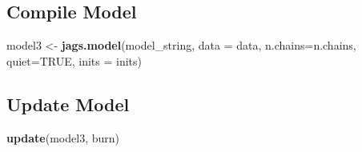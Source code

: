 \documentclass[
]{article}
\newenvironment{Shaded}{\begin{snugshade}}{\end{snugshade}}
\newcommand{\AttributeTok}[1]{\textcolor[rgb]{0.13,0.29,0.53}{#1}}
\newcommand{\ConstantTok}[1]{\textcolor[rgb]{0.56,0.35,0.01}{#1}}
\newcommand{\DecValTok}[1]{\textcolor[rgb]{0.00,0.00,0.81}{#1}}
\newcommand{\FloatTok}[1]{\textcolor[rgb]{0.00,0.00,0.81}{#1}}
\newcommand{\FunctionTok}[1]{\textcolor[rgb]{0.13,0.29,0.53}{\textbf{#1}}}
\newcommand{\NormalTok}[1]{#1}
\newcommand{\OtherTok}[1]{\textcolor[rgb]{0.56,0.35,0.01}{#1}}
\newcommand{\SpecialCharTok}[1]{\textcolor[rgb]{0.81,0.36,0.00}{\textbf{#1}}}
\begin{document}
\begin{Shaded}
\end{Shaded}

\subsection{Compile Model}\label{compile-model-2}

\begin{Shaded}
\begin{Highlighting}[]
\NormalTok{model3 }\OtherTok{\textless{}{-}} \FunctionTok{jags.model}\NormalTok{(model\_string, }\AttributeTok{data =}\NormalTok{ data, }\AttributeTok{n.chains=}\NormalTok{n.chains, }\AttributeTok{quiet=}\ConstantTok{TRUE}\NormalTok{, }\AttributeTok{inits =}\NormalTok{ inits)}
\end{Highlighting}
\end{Shaded}

\subsection{Update Model}\label{update-model-2}

\begin{Shaded}
\begin{Highlighting}[]
\FunctionTok{update}\NormalTok{(model3, burn)}
\end{Highlighting}
\end{Shaded}
\end{document}
